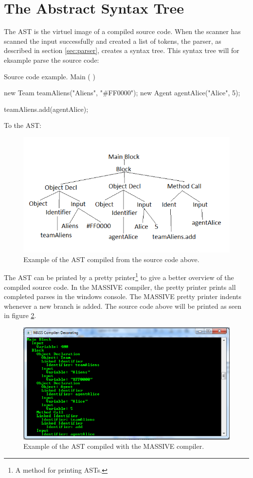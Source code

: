 \section{The Abstract Syntax Tree}
\label{AST}
The AST is the virtuel image of a compiled source code. When the scanner has scanned the input successfully and created a list of tokens, the parser, as described in section \ref{sec:parser}, creates a syntax tree. This syntax tree will for eksample parse the source code:

\begin{source}{Source code example.}{}
Main (  )
{	
	new Team teamAliens("Aliens", "#FF0000");
	new Agent agentAlice("Alice", 5);
	
	teamAliens.add(agentAlice);	
}
\end{source} 

To the AST:

\begin{figure}[H]
\begin{center}
\includegraphics[scale=0.8]{Images/ASTexample.png}
\end{center}
\caption{Example of the AST compiled from the source code above.}
\label{fig:astexample}
\end{figure}

The AST can be printed by a pretty printer\footnote{A method for printing ASTs.} to give a better overview of the compiled source code. In the MASSIVE compiler, the pretty printer prints all completed parses in the windows console. The MASSIVE pretty printer indents whenever a new branch is added. The source code above will be printed as seen in figure \ref{fig:astmasexample}.

\begin{figure}[H]
\begin{center}
\includegraphics[scale=0.7]{Images/ASTMASexample.png}
\end{center}
\caption{Example of the AST compiled with the MASSIVE compiler.}
\label{fig:astmasexample}
\end{figure}